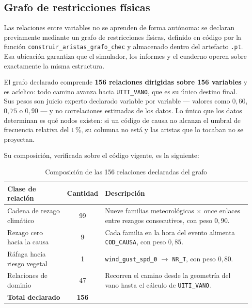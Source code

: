 \documentclass[11pt,a4paper]{article}
\begin{document}
\subsection{Grafo de restricciones físicas}
\label{sec:grafo}

Las relaciones entre variables no se aprenden de forma autónoma: se declaran previamente
mediante un grafo de restricciones físicas, definido en código por la función
\texttt{construir\_\allowbreak aristas\_\allowbreak grafo\_\allowbreak chec} y almacenado dentro del artefacto \texttt{.pt}. Esa
ubicación garantiza que el simulador, los informes y el cuaderno operen sobre exactamente la
misma estructura.

El grafo declarado comprende \textbf{156 relaciones dirigidas sobre 156 variables} y es
acíclico: todo camino avanza hacia \texttt{UITI\_VANO}, que es su único destino final. Sus
pesos son juicio experto declarado variable por variable --- valores como $0{,}60$, $0{,}75$ o
$0{,}90$ --- y no correlaciones estimadas de los datos. Lo único que los datos determinan es
qué nodos existen: si un código de causa no alcanza el umbral de frecuencia relativa del
$1$\,\%, su columna no está y las aristas que lo tocaban no se proyectan.

Su composición, verificada sobre el código vigente, es la siguiente:

\begin{table}[H]
\centering
\caption{Composición de las 156 relaciones declaradas del grafo}
\label{tab:grafocomposicion}
\small
\begin{tabularx}{\textwidth}{L{5.6cm} c X}
\toprule
\textbf{Clase de relación} & \textbf{Cantidad} & \textbf{Descripción} \\
\midrule
Cadena de rezago climático & 99 & Nueve familias meteorológicas $\times$ once enlaces entre rezagos consecutivos, con peso $0{,}90$. \\
Rezago cero hacia la causa & 9 & Cada familia en la hora del evento alimenta \texttt{COD\_CAUSA}, con peso $0{,}85$. \\
Ráfaga hacia riesgo vegetal & 1 & \texttt{wind\_gust\_spd\_0} $\rightarrow$ \texttt{NR\_T}, con peso $0{,}80$. \\
Relaciones de dominio & 47 & Recorren el camino desde la geometría del vano hasta el cálculo de \texttt{UITI\_VANO}. \\
\midrule
\textbf{Total declarado} & \textbf{156} & \\
\bottomrule
\end{tabularx}
\end{table}
\end{document}
